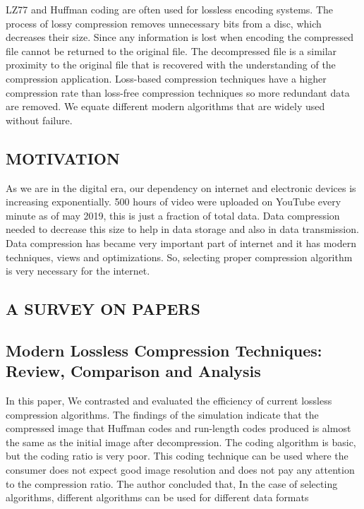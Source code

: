 \documentclass[a4paper, 12pt]{article}
\begin{document}
\par 
LZ77 and Huffman coding are often used for lossless encoding systems. The process of lossy compression removes unnecessary bits from a disc, which decreases their size. Since any information is lost when encoding the compressed file cannot be returned to the original file. The decompressed file is a similar proximity to the original file that is recovered with the understanding of the compression application. Loss-based compression techniques have a higher compression rate than loss-free compression techniques so more redundant data are removed. We equate different modern algorithms that are widely used without failure.
\\


\newpage
\begin{center}

\section{MOTIVATION}

\end{center}

\hspace{1cm}As we are in the digital era, our dependency on internet and electronic devices is increasing exponentially. 500 hours of video were uploaded on YouTube every minute as of may 2019, this is just a fraction of total data. Data compression needed to decrease this size to help in data storage and also in data transmission. 
 \\

  

\hspace{1cm}Data compression has became very important part of internet and it has modern techniques, views and optimizations. So, selecting proper compression algorithm is very necessary for the internet.
\\

\newpage
\begin{center}
\section{A SURVEY ON PAPERS}
\end{center}
\subsection{Modern Lossless Compression Techniques: Review, Comparison 
and Analysis}
\hspace{1cm} In this paper, We contrasted and evaluated the efficiency of current 
lossless compression algorithms. The findings of the simulation indicate that the 
compressed image that Huffman codes and run-length codes produced is almost 
the same as the initial image after decompression. The coding algorithm is basic,
but the coding ratio is very poor. This coding technique can be used where the 
consumer does not expect good image resolution and does not pay any attention 
to the compression ratio.
The author concluded that, In the case of selecting algorithms, different 
algorithms can be used for different data formats
\end{document}
